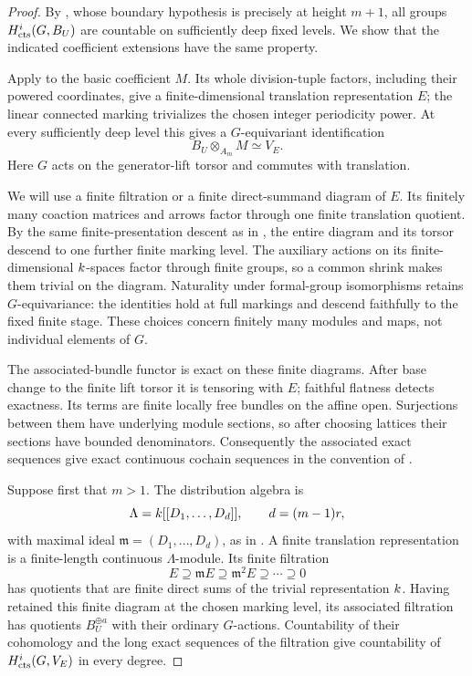 \begin{proof}
By , whose boundary hypothesis is precisely
 at height $m+1$, all groups
$H^i_{\mathrm{cts}}(G,B_U)$ are countable on sufficiently deep fixed levels.
We show that the indicated coefficient extensions have the same property.

Apply  to the basic coefficient
$M$. Its whole division-tuple factors, including their powered
coordinates, give a finite-dimensional translation representation $E$;
the linear connected marking trivializes the chosen integer periodicity
power. At every sufficiently deep level this gives a $G$-equivariant
identification
\[
 B_U\otimes_{A_m}M\simeq V_E.
\]
Here $G$ acts on the generator-lift torsor and commutes with translation.

We will use a finite filtration or a finite direct-summand diagram of
$E$. Its finitely many coaction matrices and arrows factor through one
finite translation quotient. By the same finite-presentation descent
as in , the entire
diagram and its torsor descend to one further finite marking level.
The auxiliary actions on its finite-dimensional $k$-spaces factor
through finite groups, so a common shrink makes them trivial on the
diagram. Naturality under formal-group isomorphisms retains
$G$-equivariance: the identities hold at full markings and descend
faithfully to the fixed finite stage. These choices concern finitely
many modules and maps, not individual elements of $G$.

The associated-bundle functor is exact on these finite diagrams.
After base change to the finite lift torsor it is tensoring with $E$;
faithful flatness detects exactness.  Its terms are finite locally free
bundles on the affine open.  Surjections between them have underlying
module sections, so after choosing lattices their sections have bounded
denominators.  Consequently the associated exact sequences give exact
continuous cochain sequences in the convention of
.

Suppose first that $m>1$.  The distribution algebra is
\[
 \Lambda=k[[D_1,\ldots,D_d]],\qquad d=(m-1)r,
\]
with maximal ideal $\mathfrak m=(D_1,\ldots,D_d)$, as in
.  A finite translation representation is a
finite-length continuous $\Lambda$-module.  Its finite filtration
\[
 E\supseteq\mathfrak mE\supseteq\mathfrak m^2E
 \supseteq\cdots\supseteq0
\]
has quotients that are finite direct sums of the trivial representation
$k$.  Having retained this finite diagram at the chosen marking level,
its associated filtration has quotients $B_U^{\oplus a}$ with their
ordinary $G$-actions.  Countability of their cohomology and the long exact
sequences of the filtration give countability of
$H^i_{\mathrm{cts}}(G,V_E)$ in every degree.


\end{proof}
